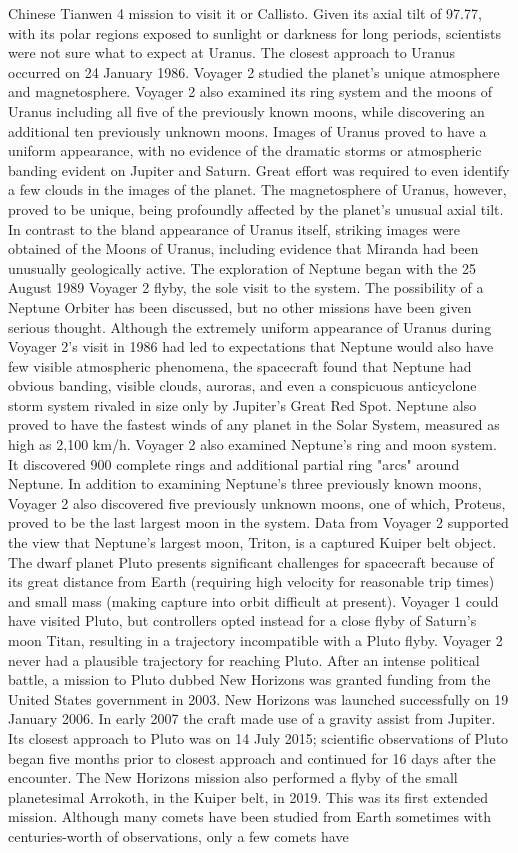 \documentclass[12pt]{article}
\begin{document}
Chinese Tianwen 4 mission to visit it or Callisto. Given its axial tilt of 97.77, with its polar regions exposed to sunlight or darkness for long periods, scientists were not sure what to expect at Uranus. The closest approach to Uranus occurred on 24 January 1986. Voyager 2 studied the planet's unique atmosphere and magnetosphere. Voyager 2 also examined its ring system and the moons of Uranus including all five of the previously known moons, while discovering an additional ten previously unknown moons. Images of Uranus proved to have a uniform appearance, with no evidence of the dramatic storms or atmospheric banding evident on Jupiter and Saturn. Great effort was required to even identify a few clouds in the images of the planet. The magnetosphere of Uranus, however, proved to be unique, being profoundly affected by the planet's unusual axial tilt. In contrast to the bland appearance of Uranus itself, striking images were obtained of the Moons of Uranus, including evidence that Miranda had been unusually geologically active. The exploration of Neptune began with the 25 August 1989 Voyager 2 flyby, the sole visit to the system. The possibility of a Neptune Orbiter has been discussed, but no other missions have been given serious thought. Although the extremely uniform appearance of Uranus during Voyager 2's visit in 1986 had led to expectations that Neptune would also have few visible atmospheric phenomena, the spacecraft found that Neptune had obvious banding, visible clouds, auroras, and even a conspicuous anticyclone storm system rivaled in size only by Jupiter's Great Red Spot. Neptune also proved to have the fastest winds of any planet in the Solar System, measured as high as 2,100 km/h. Voyager 2 also examined Neptune's ring and moon system. It discovered 900 complete rings and additional partial ring "arcs" around Neptune. In addition to examining Neptune's three previously known moons, Voyager 2 also discovered five previously unknown moons, one of which, Proteus, proved to be the last largest moon in the system. Data from Voyager 2 supported the view that Neptune's largest moon, Triton, is a captured Kuiper belt object. The dwarf planet Pluto presents significant challenges for spacecraft because of its great distance from Earth (requiring high velocity for reasonable trip times) and small mass (making capture into orbit difficult at present). Voyager 1 could have visited Pluto, but controllers opted instead for a close flyby of Saturn's moon Titan, resulting in a trajectory incompatible with a Pluto flyby. Voyager 2 never had a plausible trajectory for reaching Pluto. After an intense political battle, a mission to Pluto dubbed New Horizons was granted funding from the United States government in 2003. New Horizons was launched successfully on 19 January 2006. In early 2007 the craft made use of a gravity assist from Jupiter. Its closest approach to Pluto was on 14 July 2015; scientific observations of Pluto began five months prior to closest approach and continued for 16 days after the encounter. The New Horizons mission also performed a flyby of the small planetesimal Arrokoth, in the Kuiper belt, in 2019. This was its first extended mission. Although many comets have been studied from Earth sometimes with centuries-worth of observations, only a few comets have 
\end{document}
